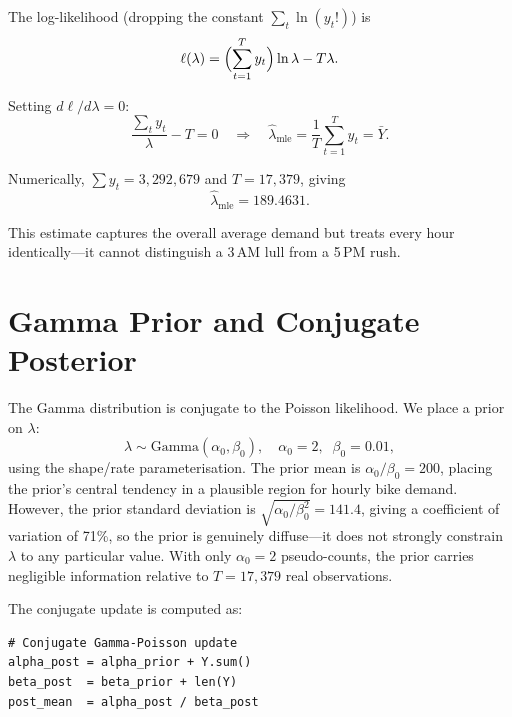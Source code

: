 \documentclass[12pt]{article}
\begin{document}
The log-likelihood (dropping the constant $\sum_t \ln(y_t!)$) is
\begin{equation}
\ell(\lambda) = \Bigl(\sum_{t=1}^{T} y_t\Bigr) \ln \lambda - T\lambda.
\end{equation}

Setting $d\ell/d\lambda = 0$:
\begin{equation}
\frac{\sum_t y_t}{\lambda} - T = 0
\quad\Longrightarrow\quad
\hat{\lambda}_{\mathrm{mle}} = \frac{1}{T}\sum_{t=1}^{T} y_t = \bar{Y}.
\end{equation}

Numerically, $\sum y_t = 3{,}292{,}679$ and $T = 17{,}379$, giving
\begin{equation}
\hat{\lambda}_{\mathrm{mle}} = 189.4631.
\end{equation}

This estimate captures the overall average demand but treats every
hour identically---it cannot distinguish a 3\,AM lull from a 5\,PM
rush.

\section{Gamma Prior and Conjugate Posterior}
\label{sec:posterior}

The Gamma distribution is conjugate to the Poisson likelihood.  We
place a prior on $\lambda$:
\begin{equation}
\lambda \sim \text{Gamma}(\alpha_0, \beta_0),
\quad \alpha_0 = 2,\;\; \beta_0 = 0.01,
\end{equation}
using the shape/rate parameterisation.  The prior mean is
$\alpha_0/\beta_0 = 200$, placing the prior's central tendency in a
plausible region for hourly bike demand.  However, the prior standard
deviation is $\sqrt{\alpha_0/\beta_0^2} = 141.4$, giving a coefficient
of variation of 71\%, so the prior is genuinely diffuse---it does not
strongly constrain $\lambda$ to any particular value.  With only
$\alpha_0 = 2$ pseudo-counts, the prior carries negligible
information relative to $T = 17{,}379$ real observations.

The conjugate update is computed as:
\begin{small}
\begin{verbatim}
# Conjugate Gamma-Poisson update
alpha_post = alpha_prior + Y.sum()
beta_post  = beta_prior + len(Y)
post_mean  = alpha_post / beta_post
\end{verbatim}
\end{small}
\end{document}
